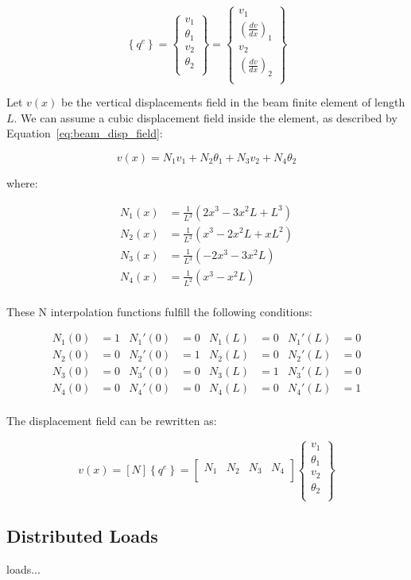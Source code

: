 \[
  \left\{ q^e \right\} =
  \begin{Bmatrix}
    v_1 \\
    \theta_1 \\
    v_2 \\
    \theta_2 \\
  \end{Bmatrix} =
  \begin{Bmatrix}
    v_1 \\
    \left( \frac{dv}{dx} \right)_1 \\
    v_2 \\
    \left( \frac{dv}{dx} \right)_2 \\
  \end{Bmatrix}
\]

Let $v(x)$ be the vertical displacements field in the beam finite element of length $L$.
We can assume a cubic displacement field inside the element, as described by Equation~\ref{eq:beam_disp_field}:

\begin{equation}
  \label{eq:beam_disp_field}
  v(x) = N_1 v_1 + N_2 \theta_1 + N_3 v_2 + N_4 \theta_2
\end{equation}

where:

\begin{equation}
  \begin{split}
    N_1(x) & = \frac{1}{L^3} \left( 2x^3 -3x^2L + L^3 \right) \\
    N_2(x) & = \frac{1}{L^2} \left( x^3 - 2x^2L + xL^2 \right) \\
    N_3(x) & = \frac{1}{L^3} \left( -2x^3 - 3x^2L \right) \\
    N_4(x) & = \frac{1}{L^2} \left( x^3 - x^2L \right) \\
  \end{split}
\end{equation}

These N interpolation functions fulfill the following conditions:

\[
  \begin{aligned}
    N_1(0) & = 1    &    N_1'(0) & = 0    &    N_1(L) & = 0    &    N_1'(L) & = 0 \\
    N_2(0) & = 0    &    N_2'(0) & = 1    &    N_2(L) & = 0    &    N_2'(L) & = 0 \\
    N_3(0) & = 0    &    N_3'(0) & = 0    &    N_3(L) & = 1    &    N_3'(L) & = 0 \\
    N_4(0) & = 0    &    N_4'(0) & = 0    &    N_4(L) & = 0    &    N_4'(L) & = 1 \\
  \end{aligned}
\]

The displacement field can be rewritten as:

\[
  v(x) = \left[ N \right] \left\{ q^e \right\} =
  \begin{bmatrix}
    N_1 & N_2 & N_3 & N_4 \\
  \end{bmatrix}
  \begin{Bmatrix}
    v_1 \\
    \theta_1 \\
    v_2 \\
    \theta_2 \\
  \end{Bmatrix}
\]


\subsection{Distributed Loads}

loads...
